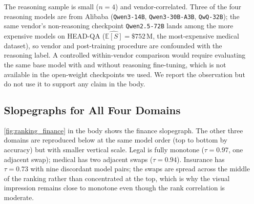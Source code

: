 \documentclass[11pt]{article}
\newcommand{\ES}{\mathbb{E}[S]}
\begin{document}
The reasoning sample is small ($n=4$) and vendor-correlated.
Three of the four reasoning models are from Alibaba (\texttt{Qwen3-14B},
\texttt{Qwen3-30B-A3B}, \texttt{QwQ-32B}); the same vendor's non-reasoning
checkpoint \texttt{Qwen2.5-72B} lands among the more expensive models on
HEAD-QA ($\widehat{\ES} = \$752$\,M, the most-expensive medical
dataset), so vendor and
post-training procedure are confounded with the reasoning label.
A controlled within-vendor comparison would require evaluating
the same base model with and without reasoning fine-tuning,
which is not available in the open-weight checkpoints we used.
We report the observation but do not use it to support any
claim in the body.

\subsection{Slopegraphs for All Four Domains}
\label{sec:app-slopegraphs}

\autoref{fig:ranking_finance} in the body shows the finance
slopegraph. The other three domains are reproduced below at the
same model order (top to bottom by accuracy) but with smaller
vertical scale. Legal is fully monotone ($\tau{=}0.97$, one
adjacent swap); medical has two adjacent swaps ($\tau{=}0.94$).
Insurance has $\tau{=}0.73$ with nine discordant model pairs;
the swaps are spread across the middle of the ranking rather
than concentrated at the top, which is why the visual impression
remains close to monotone even though the rank correlation is
moderate.
\end{document}
